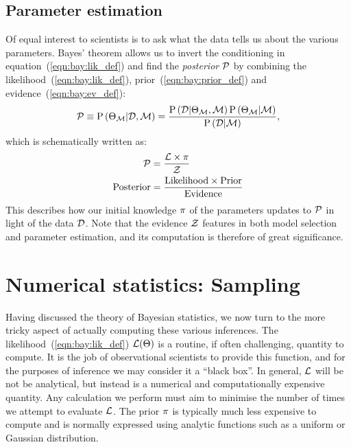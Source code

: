 \subsection{Parameter estimation}
Of equal interest to scientists is to ask what the data tells us about the various parameters.  
Bayes' theorem allows us to invert the conditioning in equation~(\ref{eqn:bay:lik_def}) and find the {\em posterior\/} $\mathcal{P}$ by combining the likelihood~(\ref{eqn:bay:lik_def}), prior~(\ref{eqn:bay:prior_def}) and evidence~(\ref{eqn:bay:ev_def}):
%
\begin{equation}
  \mathcal{P}\equiv
  \mathrm{P}\left(\Theta_{\mathcal{M}}\middle|\mathcal{D},\mathcal{M}\right) = \frac{\mathrm{P}\left(\mathcal{D}\middle|\Theta_{\mathcal{M}},\mathcal{M}\right) \mathrm{P}\left(\Theta_{\mathcal{M}}\middle|\mathcal{M}\right)}{\mathrm{P}\left(\mathcal{D}\middle|\mathcal{M}\right)},
  \label{eqn:bay:bayes_theorem}
\end{equation}
%
which is schematically written as:
\begin{align}
  \mathcal{P} &= \frac{\mathcal{L} \times \pi }{\mathcal{Z} }
  \label{eqn:bay:bayes_theorem_abbrv}\\
  \mathrm{Posterior} &= \frac{\mathrm{Likelihood} \times \mathrm{Prior} }{\mathrm{Evidence} }
\end{align}
This describes how our initial knowledge $\pi$ of the parameters updates to $\mathcal{P}$ in light of the data $\mathcal{D}$. Note that the evidence $\mathcal{Z}$ features in both model selection and parameter estimation, and its computation is therefore of great significance.







\section{Numerical statistics: Sampling}
\label{sec:bay:samp}
Having discussed the theory of Bayesian statistics, we now turn to the more tricky aspect of actually computing these various inferences. The likelihood~(\ref{eqn:bay:lik_def}) $\mathcal{L}(\Theta)$ is a routine, if often challenging, quantity to compute. It is the job of observational scientists to provide this function, and for the purposes of inference we may consider it a ``black box''. In general, $\mathcal{L}$ will be not be analytical, but instead is a numerical and computationally expensive quantity. Any calculation we perform must aim to minimise the number of times we attempt to evaluate $\mathcal{L}$. The prior $\pi$ is typically much less expensive to compute and is normally expressed using analytic functions such as a uniform or Gaussian distribution.

